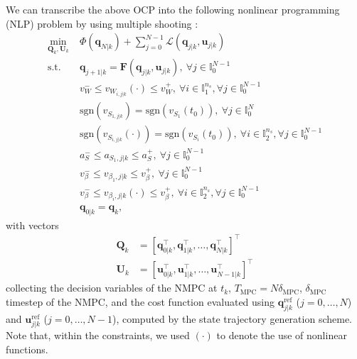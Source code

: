 We can transcribe the above OCP into the following nonlinear programming (NLP)
problem by using multiple shooting \cite{Bock1984MultipleShooting}:
\begin{equation*}
    \begin{aligned}
        \min_{\bm{Q}_k, \bm{U}_k} \;
            & \Phi(\bm{q}_{N|k}) + \sum_{j=0}^{N-1} \mathcal{L}(\bm{q}_{j|k}, \bm{u}_{j|k}) \\
            \text{s.t. } & \bm{q}_{j+1|k} = \bm{F}(\bm{q}_{j|k}, \bm{u}_{j|k}),\: \forall j \in \mathbb{I}_0^{N-1} \\
                         & v_W^- \le v_{W_{i,j|k}}(\cdot) \le v_W^+,\: \forall i \in \mathbb{I}_1^{n_s}, \forall j \in \mathbb{I}_0^{N-1} \\
                         & \mathrm{sgn}(v_{S_{1,j|k}}) = \mathrm{sgn}(v_{S_1}(t_0)),\: \forall j \in \mathbb{I}_0^N \\
                         & \mathrm{sgn}(v_{S_{i,j|k}}(\cdot)) = \mathrm{sgn}(v_{S_i}(t_0)),\: \forall i \in \mathbb{I}_2^{n_s}, \forall j \in \mathbb{I}_0^{N-1} \\
                         & a_S^- \le a_{S_1,j|k} \le a_S^+,\: \forall j \in \mathbb{I}_0^{N-1} \\
                         & v_{\beta}^- \le v_{\beta_1,j|k} \le v_{\beta}^+,\: \forall j \in \mathbb{I}_0^{N-1} \\
                         & v_{\beta}^- \le v_{\beta_i,j|k}(\cdot) \le v_{\beta}^+,\: \forall i \in \mathbb{I}_2^{n_s}, \forall j \in \mathbb{I}_0^{N-1} \\
                         & \bm{q}_{0|k} = \bm{q}_k,
    \end{aligned}
\end{equation*}
with vectors
\begin{align*}
\bm{Q}_k &= \left[\bm{q}_{0|k}^\top, \bm{q}_{1|k}^\top, \dots, \bm{q}_{N|k}^\top\right]^\top \\
\bm{U}_k &= \left[\bm{u}_{0|k}^\top, \bm{u}_{1|k}^\top, \dots, \bm{u}_{N-1|k}^\top\right]^\top
\end{align*}
collecting the decision variables of the NMPC at $t_k$,
$T_{\mathrm{MPC}}=N\delta_{\mathrm{MPC}}$, $\delta_{\mathrm{MPC}}$ timestep of
the NMPC, and the cost function evaluated using
$\bm{q}_{j|k}^{\mathrm{ref}}$ ($j = 0, \dots, N$) and
$\bm{u}_{j|k}^{\mathrm{ref}}$ ($j = 0, \dots, N - 1$), computed by the state
trajectory generation scheme. Note that, within the constraints, we used
$(\cdot)$ to denote the use of nonlinear functions.

